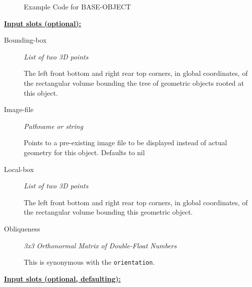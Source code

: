 \documentclass [11pt]{book}
\begin{document}
\begin{itemize}
\begin{figure}
\begin{lrbox}{\boxedverb}
\begin{minipage}{\linewidth}
{\begin{verbatim}
\end{verbatim}}
\end{minipage}
\end{lrbox}
\fbox{\usebox{\boxedverb}}

\caption{Example Code for BASE-OBJECT}

\label{fig:example-code-BASE-OBJECT}

\end{figure}





\textbf{
\underline{Input slots (optional):}}

\begin{description}

\item [Bounding-box]
\emph{List of two 3D points}

 The left front bottom and right rear top corners, in global coordinates,
of the rectangular volume bounding the tree of geometric objects rooted at this object.




\item [Image-file]
\emph{Pathname or string}

 Points to a pre-existing image file to be displayed instead of actual geometry for this object. Defaults to nil




\item [Local-box]
\emph{List of two 3D points}

 The left front bottom and right rear top corners, in global coordinates,
of the rectangular volume bounding this geometric object.




\item [Obliqueness]
\emph{3x3 Orthonormal Matrix of Double-Float Numbers}

 This is synonymous with the \texttt{orientation}.




\end{description}






\textbf{
\underline{Input slots (optional, defaulting):}}

\begin{description}


\end{description}
\end{itemize}
\end{document}
